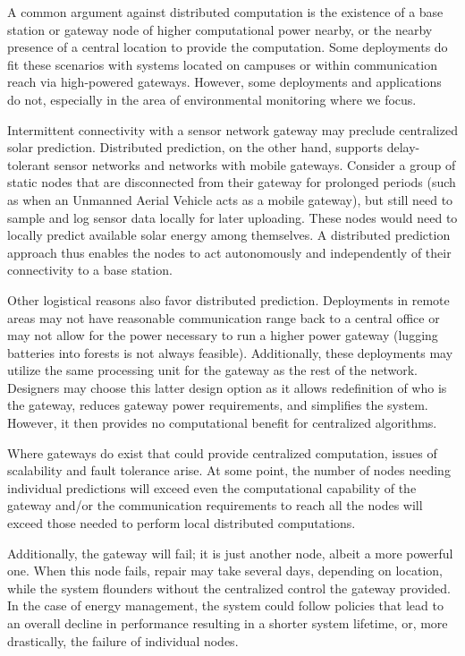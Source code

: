 \documentclass[prodmode,acmtosn]{acmsmall}
\begin{document}
A common argument against distributed computation is the existence of a base station or gateway node of higher computational power nearby, or the nearby presence of a central location to provide the computation.
Some deployments do fit these scenarios with systems located on campuses or within communication reach via high-powered gateways.
However, some deployments and applications do not, especially in the area of environmental monitoring where we focus.

Intermittent connectivity with a sensor network gateway may preclude centralized solar prediction. Distributed prediction, on the other hand, supports delay-tolerant sensor networks and networks with mobile gateways. Consider a group of static nodes that are disconnected from their gateway for prolonged periods (such as when an Unmanned Aerial Vehicle acts as a mobile gateway), but still need to sample and log sensor data locally for later uploading. These nodes would need to locally predict available solar energy among themselves. A distributed prediction approach thus enables the nodes to act autonomously and independently of their connectivity to a base station. 

Other logistical reasons also favor distributed prediction. Deployments in remote areas may not have reasonable communication range back to a central office or may not allow for the power necessary to run a higher power gateway (lugging batteries into forests is not always feasible).
Additionally, these deployments may utilize the same processing unit for the gateway as the rest of the network.
Designers may choose this latter design option as it allows redefinition of who is the gateway, reduces gateway power requirements, and simplifies the system.
However, it then provides no computational benefit for centralized algorithms.

Where gateways do exist that could provide centralized computation, issues of scalability and fault tolerance arise.
At some point, the number of nodes needing individual predictions will exceed even the computational capability of the gateway and/or the communication requirements to reach all the nodes will exceed those needed to perform local distributed computations.

Additionally, the gateway will fail; it is just another node, albeit a more powerful one.
When this node fails, repair may take several days, depending on location, while the system flounders without the centralized control the gateway provided.
In the case of energy management, the system could follow policies that lead to an overall decline in performance resulting in a shorter system lifetime, or, more drastically, the failure of individual nodes.
\end{document}
